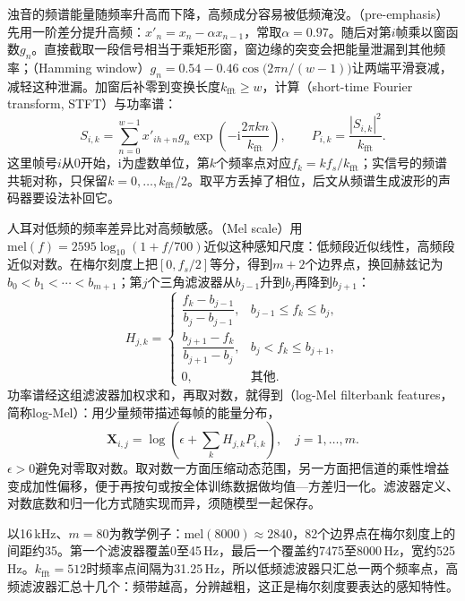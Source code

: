 浊音的频谱能量随频率升高而下降，高频成分容易被低频淹没。（pre-emphasis）先用一阶差分提升高频：$x'_n=x_n-\alpha x_{n-1}$，常取$\alpha=0.97$。随后对第$i$帧乘以窗函数$g_n$。直接截取一段信号相当于乘矩形窗，窗边缘的突变会把能量泄漏到其他频率；（Hamming window）$g_n=0.54-0.46\cos\bigl(2\pi n/(w-1)\bigr)$让两端平滑衰减，减轻这种泄漏。加窗后补零到变换长度$k_{\mathrm{fft}}\geq w$，计算（short-time Fourier transform, STFT）与功率谱：
\begin{equation}
 S_{i,k}=\sum_{n=0}^{w-1}x'_{ih+n}g_n
       \exp\!\left(-\mathrm{i}\frac{2\pi kn}{k_{\mathrm{fft}}}\right),
 \qquad P_{i,k}=\frac{|S_{i,k}|^2}{k_{\mathrm{fft}}}.
 \label{eq:nlp-speech-stft}
\end{equation}
这里帧号$i$从0开始，$\mathrm{i}$为虚数单位，第$k$个频率点对应$f_k=kf_s/k_{\mathrm{fft}}$；实信号的频谱共轭对称，只保留$k=0,\ldots,k_{\mathrm{fft}}/2$。取平方丢掉了相位，后文从频谱生成波形的声码器要设法补回它。

人耳对低频的频率差异比对高频敏感。（Mel scale）用$\mathrm{mel}(f)=2595\log_{10}(1+f/700)$近似这种感知尺度：低频段近似线性，高频段近似对数。在梅尔刻度上把$[0,f_s/2]$等分，得到$m+2$个边界点，换回赫兹记为$b_0<b_1<\cdots<b_{m+1}$；第$j$个三角滤波器从$b_{j-1}$升到$b_j$再降到$b_{j+1}$：
\begin{equation}
 H_{j,k}=
 \begin{cases}
  \dfrac{f_k-b_{j-1}}{b_j-b_{j-1}}, & b_{j-1}\leq f_k\leq b_j,\\[2mm]
  \dfrac{b_{j+1}-f_k}{b_{j+1}-b_j}, & b_j< f_k\leq b_{j+1},\\[1mm]
  0, & \text{其他}.
 \end{cases}
 \label{eq:nlp-speech-mel-filter}
\end{equation}
功率谱经这组滤波器加权求和，再取对数，就得到（log-Mel filterbank features，简称log-Mel）：用少量频带描述每帧的能量分布，
\begin{equation}
 \bm{X}_{i,j}=\log\!\left(\epsilon+
                   \sum_k H_{j,k}P_{i,k}\right),
 \quad j=1,\ldots,m.
 \label{eq:nlp-speech-logmel}
\end{equation}
$\epsilon>0$避免对零取对数。取对数一方面压缩动态范围，另一方面把信道的乘性增益变成加性偏移，便于再按句或按全体训练数据做均值—方差归一化。滤波器定义、对数底数和归一化方式随实现而异，须随模型一起保存。

以16\,kHz、$m=80$为教学例子：$\mathrm{mel}(8000)\approx2840$，82个边界点在梅尔刻度上的间距约35。第一个滤波器覆盖0至45\,Hz，最后一个覆盖约7475至8000\,Hz，宽约525\,Hz。$k_{\mathrm{fft}}=512$时频率点间隔为31.25\,Hz，所以低频滤波器只汇总一两个频率点，高频滤波器汇总十几个：频带越高，分辨越粗，这正是梅尔刻度要表达的感知特性。

